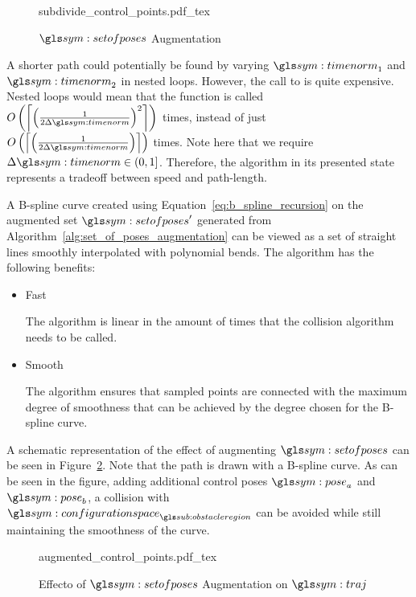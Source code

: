 		\begin{figure}[hb]
			\centering
			\def\svgwidth{0.7\columnwidth}
			{subdivide_control_points.pdf_tex}
			\caption{$\setofposes$ Augmentation}%
			\label{fig:set_of_poses_augmentation}
		\end{figure}

		A shorter path could potentially be found by varying $\timenorm_1$ and
		$\timenorm_2$ in nested loops. However, the call to
		 is quite expensive. Nested loops
		would mean that the function is called
		\(
			O
			\left(
				\ceil*
				{%
					{%
						\left(
							\frac
							{%
								1
							}
							{%
								2\Delta\timenorm
							}
						\right)
					}^2
				}
			\right)
		\)
		times, instead of just
		\(
			O
			\left(
				\ceil*
				{%
					\left(
						\frac
						{%
							1
						}
						{%
							2\Delta\timenorm
						}
					\right)
				}
			\right)
		\)
		times. Note here that we require $\Delta\timenorm \in (0, 1]$.
		Therefore, the algorithm in its presented state represents a tradeoff
		between speed and path-length.

		A B-spline curve created using Equation~\ref{eq:b_spline_recursion} on
		the augmented set $\setofposes'$ generated from
		Algorithm~\ref{alg:set_of_poses_augmentation} can be viewed as a set of
		straight lines smoothly interpolated with polynomial bends. The
		algorithm has the following benefits:

		\begin{itemize}

			\item Fast

				The algorithm is linear in the amount of times that the
				collision algorithm needs to be called.

			\item Smooth

				The algorithm ensures that sampled points are connected with the
				maximum degree of smoothness that can be achieved by the degree
				chosen for the B-spline curve.
		\end{itemize}

		A schematic representation of the effect of augmenting $\setofposes$ can
		be seen in Figure~\ref{fig:set_of_poses_augmentation_path}. Note that
		the path is drawn with a B-spline curve. As can be seen in the figure,
		adding additional control poses $\pose_a$ and $\pose_b$, a collision
		with $\configurationspace_{\obstacleregion}$ can be avoided while still
		maintaining the smoothness of the curve.

		\begin{figure}[hb]
			\centering
			\def\svgwidth{\columnwidth}
			{augmented_control_points.pdf_tex}
			\caption{Effecto of $\setofposes$ Augmentation on $\pathsym$}
			\label{fig:set_of_poses_augmentation_path}
		\end{figure}
